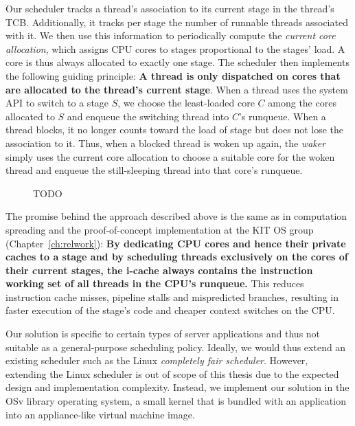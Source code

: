 \documentclass[12pt,a4paper]{book}
\begin{document}
Our scheduler tracks a thread's association to its current stage in the thread's TCB.
Additionally, it tracks per stage the number of runnable threads associated with it.
We then use this information to periodically compute the \emph{current core allocation}, which assigns CPU cores to stages proportional to the stages' load.
A core is thus always allocated to exactly one stage. %
The scheduler then implements the following guiding principle: \textbf{A thread is only dispatched on cores that are allocated to the thread's current stage}.
When a thread uses the system API to switch to a stage $S$, we choose the least-loaded core $C$ among the cores allocated to $S$ and enqueue the switching thread into $C$'s runqueue.
When a thread blocks, it no longer counts toward the load of stage but does not lose the association to it.
Thus, when a blocked thread is woken up again, the \emph{waker} simply uses the current core allocation to choose a suitable core for the woken thread and enqueue the still-sleeping thread into that core's runqueue.

\begin{figure}[h]
    \caption{TODO}
\end{figure}

The promise behind the approach described above is the same as in computation spreading and the proof-of-concept implementation at the KIT OS group (Chapter~\ref{ch:relwork}):
\textbf{By dedicating CPU cores and hence their private caches to a stage and by scheduling threads exclusively on the cores of their current stages, the i-cache always contains the instruction working set of all threads in the CPU's runqueue.}
This reduces instruction cache misses, pipeline stalls and mispredicted branches, resulting in faster execution of the stage's code and cheaper context switches on the CPU.

Our solution is specific to certain types of server applications and thus not suitable as a general-purpose scheduling policy.
Ideally, we would thus extend an existing scheduler such as the Linux \emph{completely fair scheduler}.
However, extending the Linux scheduler is out of scope of this thesis due to the expected design and implementation complexity.
Instead, we implement our solution in the OSv library operating system, a small kernel that is bundled with an application into an appliance-like virtual machine image.
\end{document}
